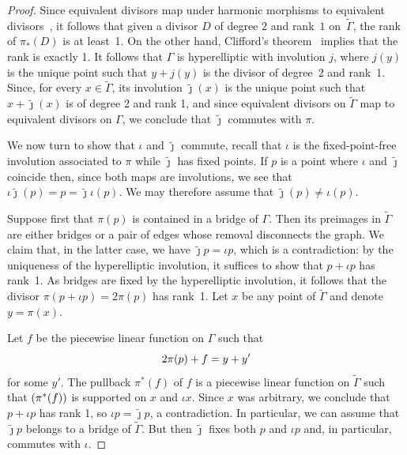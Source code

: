 \documentclass[11pt]{article}
\theoremstyle{definition}
\numberwithin{equation}{section}
\theoremstyle{definition}
\newcommand{\tGa}{\widetilde{\Gamma}}
\newcommand{\tj}{\widetilde{\jmath}}
\newcommand{\wt}[1]{\widetilde{#1}}
\let\ddiv\relax
\DeclareMathOperator{\ddiv}{div}
\begin{document}
    \begin{proof} 
     Since equivalent divisors map under harmonic morphisms to equivalent divisors~\cite[Proposition 1.4.2]{LenUlirsch_Prym}, it follows that given a divisor  $D$ of degree $2$ and rank~$1$ on~$\tGa$, the rank of $\pi_*(D)$ is at least~1. On the other hand, Clifford's theorem~\cite[Theorem~1]{Facchini_Clifford} implies that the rank is exactly 1. It follows that $\Gamma$ is hyperelliptic with involution $j$, where $j(y)$ is the unique point such that $y+j(y)$ is the divisor of degree~2 and rank~1. Since, for every $x\in\wt\Gamma$, its involution $\tj(x)$ is the unique point such that $x+\tj(x)$ is of degree 2 and rank 1, and since equivalent divisors on $\wt\Gamma$ map to equivalent divisors on $\Gamma$, we conclude that $\tj$ commutes with $\pi$. 

    We now turn to show that $\iota$ and $\tj$ commute, recall that $\iota$ is the fixed-point-free involution associated to $\pi$ while $\tj$ has fixed points. 
     If $p$ is a point where $\iota$ and $\tj$ coincide then, since both maps are involutions, we see that $\iota\tj(p) = p = \tj\iota(p)$. We may therefore assume that $\tj(p)\neq\iota(p)$.
    

       Suppose first that $\pi(p)$  is contained in a bridge of $\Gamma$. Then its preimages in $\wt\Gamma$ are either bridges or a pair of edges whose removal disconnects the graph. 
              We claim that, in the latter case, we have $\tj p = \iota p$, which is a contradiction: by the uniqueness of the hyperelliptic involution, it suffices to show that $p+\iota p$ has rank~1. As bridges are fixed by the hyperelliptic involution, it follows that the divisor $\pi(p + \iota p) = 2\pi(p)$ has rank~1.  
Let $x$ be any point of $\wt\Gamma$ and denote $y=\pi(x)$.
 
Let $f$ be the piecewise linear function on $\Gamma$ such that \[2\pi(p)+\ddiv f=y+y'\]  for some $y'$. 
The pullback  $\pi^*(f)$ of $f$ is a piecewise linear function on $\tGa$ such that $\ddiv(\pi^*(f))$ is supported on $x$ and $\iota x$. Since $x$ was arbitrary, we conclude that $p+\iota p$ has rank 1, so $\iota p = \tj p$, a contradiction. In particular, we can assume that $\tj p$ belongs to a bridge of $\wt\Gamma$. But then $\tj$ fixes both $p$ and $\iota p$ and, in particular, commutes with $\iota $.  


\end{proof}
\end{document}

